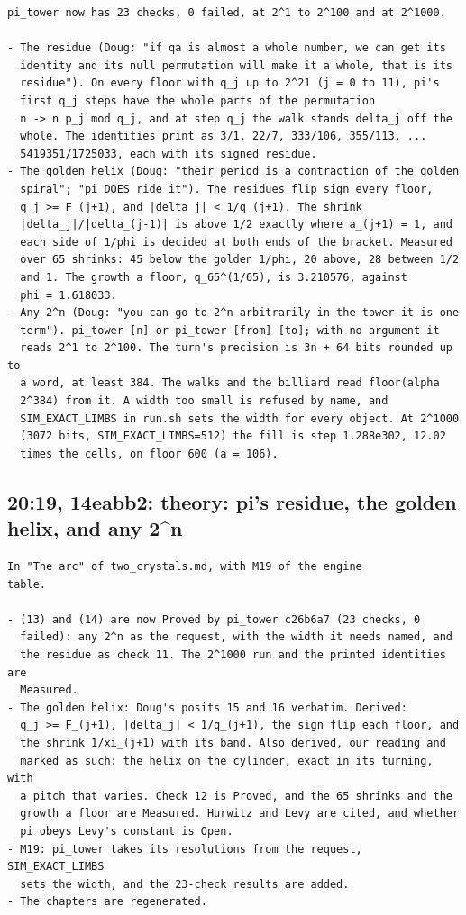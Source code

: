 \begin{Verbatim}
pi_tower now has 23 checks, 0 failed, at 2^1 to 2^100 and at 2^1000.

- The residue (Doug: "if qa is almost a whole number, we can get its
  identity and its null permutation will make it a whole, that is its
  residue"). On every floor with q_j up to 2^21 (j = 0 to 11), pi's
  first q_j steps have the whole parts of the permutation
  n -> n p_j mod q_j, and at step q_j the walk stands delta_j off the
  whole. The identities print as 3/1, 22/7, 333/106, 355/113, ...
  5419351/1725033, each with its signed residue.
- The golden helix (Doug: "their period is a contraction of the golden
  spiral"; "pi DOES ride it"). The residues flip sign every floor,
  q_j >= F_(j+1), and |delta_j| < 1/q_(j+1). The shrink
  |delta_j|/|delta_(j-1)| is above 1/2 exactly where a_(j+1) = 1, and
  each side of 1/phi is decided at both ends of the bracket. Measured
  over 65 shrinks: 45 below the golden 1/phi, 20 above, 28 between 1/2
  and 1. The growth a floor, q_65^(1/65), is 3.210576, against
  phi = 1.618033.
- Any 2^n (Doug: "you can go to 2^n arbitrarily in the tower it is one
  term"). pi_tower [n] or pi_tower [from] [to]; with no argument it
  reads 2^1 to 2^100. The turn's precision is 3n + 64 bits rounded up to
  a word, at least 384. The walks and the billiard read floor(alpha
  2^384) from it. A width too small is refused by name, and
  SIM_EXACT_LIMBS in run.sh sets the width for every object. At 2^1000
  (3072 bits, SIM_EXACT_LIMBS=512) the fill is step 1.288e302, 12.02
  times the cells, on floor 600 (a = 106).
\end{Verbatim}

\subsection{\texorpdfstring{20:19, 14eabb2: theory: pi's residue, the golden helix, and any 2\textasciicircum{}n}{20:19, 14eabb2: theory: pi's residue, the golden helix, and any 2\textasciicircum{}n}}

\begin{Verbatim}
In "The arc" of two_crystals.md, with M19 of the engine
table.

- (13) and (14) are now Proved by pi_tower c26b6a7 (23 checks, 0
  failed): any 2^n as the request, with the width it needs named, and
  the residue as check 11. The 2^1000 run and the printed identities are
  Measured.
- The golden helix: Doug's posits 15 and 16 verbatim. Derived:
  q_j >= F_(j+1), |delta_j| < 1/q_(j+1), the sign flip each floor, and
  the shrink 1/xi_(j+1) with its band. Also derived, our reading and
  marked as such: the helix on the cylinder, exact in its turning, with
  a pitch that varies. Check 12 is Proved, and the 65 shrinks and the
  growth a floor are Measured. Hurwitz and Levy are cited, and whether
  pi obeys Levy's constant is Open.
- M19: pi_tower takes its resolutions from the request, SIM_EXACT_LIMBS
  sets the width, and the 23-check results are added.
- The chapters are regenerated.
\end{Verbatim}

